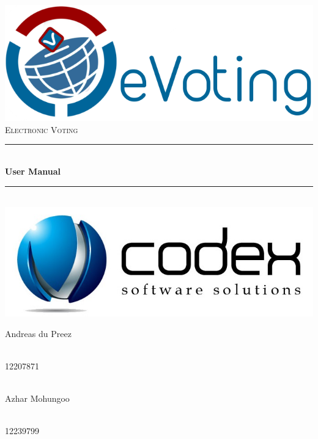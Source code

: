 \begin{titlepage}
\begin{titlepage}
	\begin{center}
		\includegraphics[width=0.7\linewidth]{../Images/eVoting_Logo.png}\\[2cm]    
		\textsc{\LARGE Electronic Voting}\\[0.5cm]
		\rule{\linewidth}{0.5mm} \\[1cm]
		{ \huge \bfseries User Manual}\\[0.5cm]
		\rule{\linewidth}{0.5mm} \\[1cm]
		

		\includegraphics[width=0.5\linewidth]{../Images/TeamCodexLogo.jpg}\\[0.5cm]    	

		
		
		\begin{minipage}{0.4\textwidth}
			\begin{flushleft} \large
				Andreas {du Preez}
			\end{flushleft}
		\end{minipage}
		\begin{minipage}{0.4\textwidth}
			\begin{flushright} \large
				\emph{} \\
				12207871 
			\end{flushright}
		\end{minipage}
		
		
		\begin{minipage}{0.4\textwidth}
			\begin{flushleft} \large
				\emph{} \\
				Azhar {Mohungoo }
			\end{flushleft}
		\end{minipage}
		\begin{minipage}{0.4\textwidth}
			\begin{flushright} \large
				\emph{} \\
				12239799
			\end{flushright}
		\end{minipage}
		

\end{center}
\end{titlepage}
\end{titlepage}
